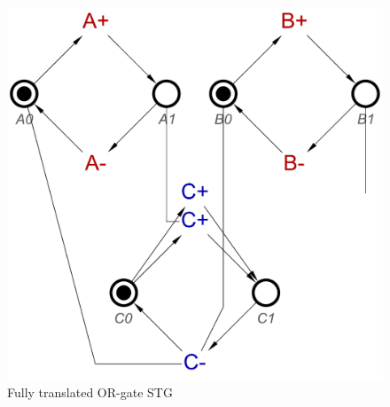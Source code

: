 \documentclass[british,conference,compsoc]{IEEEtran}
\begin{document}
\begin{figure}[h]
\vspace{-4mm}
\begin{centering}
\includegraphics[scale=0.3]{Images/or-gate-stg}
\par\end{centering}
\protect\caption{\label{fig:or-gate-stg} Fully translated OR-gate STG}
\vspace{-5mm}
\end{figure}
\end{document}
